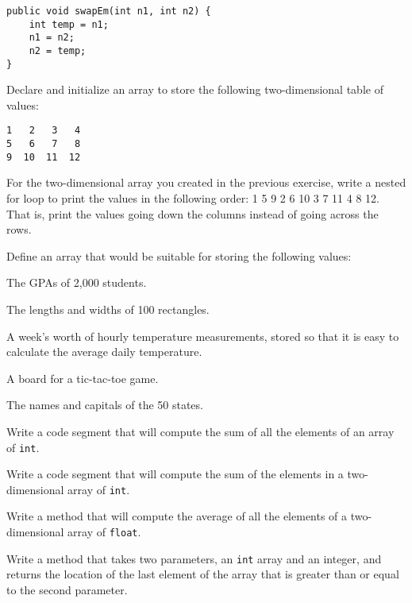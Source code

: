 \begin{EXRtwo}
\begin{jjjlisting}
\begin{lstlisting}
public void swapEm(int n1, int n2) {
    int temp = n1;
    n1 = n2;
    n2 = temp;
}
\end{lstlisting}
\end{jjjlisting}

\item  Declare and initialize an array to store the
following two-dimensional table of values:

\begin{jjjlisting}
\begin{lstlisting}
1   2   3   4
5   6   7   8
9  10  11  12
\end{lstlisting}
\end{jjjlisting}

\item  For the two-dimensional array you created in
the previous exercise, write a nested for loop to print the values in
the following order: 1 5 9 2 6 10 3 7 11 4 8 12. That is, print the
values going down the columns instead of going across the rows.

\item  Define an array that would be suitable for
storing the following values:

\begin{EXRtwoLL}
\item  The GPAs of 2,000 students.
\item  The lengths and widths of 100 rectangles.
\item  A week's worth of hourly temperature measurements,
  stored so that it is easy to calculate the average daily temperature.
\item  A board for a tic-tac-toe game.
\item  The names and capitals of the 50 states.
\end{EXRtwoLL}

\item  Write a code segment that will compute the sum
of all the elements of an array of {\tt int}.

\item  Write a code segment that will compute the
sum of the elements in a two-dimensional array of {\tt int}.

\item  Write a method that will compute the average
of all the elements of a two-dimensional array of {\tt float}.

\item  Write a method that takes two parameters, an
{\tt int} array and an integer, and returns the
location of the last element of the array
that is greater than or equal to the second parameter.


\end{EXRtwo}

